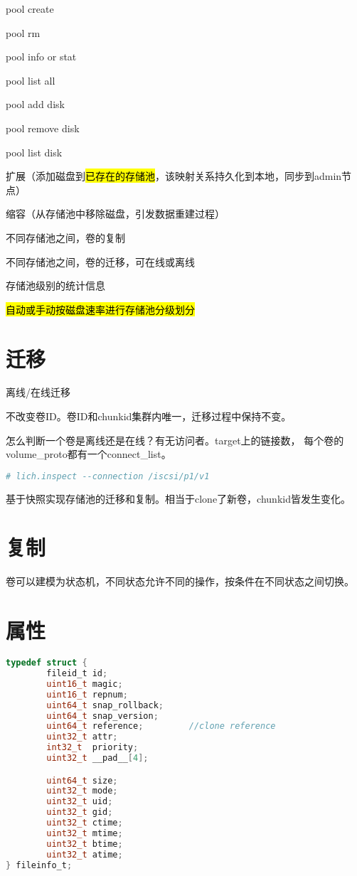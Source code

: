 \begin{enumbox}
\item pool create
\item pool rm
\item pool info or stat
\item pool list all
\item pool add disk
\item pool remove disk
\item pool list disk
\item 扩展（添加磁盘到\hl{已存在的存储池}，该映射关系持久化到本地，同步到admin节点）
\item 缩容（从存储池中移除磁盘，引发数据重建过程）
\item 不同存储池之间，卷的复制
\item 不同存储池之间，卷的迁移，可在线或离线
\item 存储池级别的统计信息
\item \hl{自动或手动按磁盘速率进行存储池分级划分}
\end{enumbox}

\section{迁移}

离线/在线迁移

不改变卷ID。卷ID和chunkid集群内唯一，迁移过程中保持不变。

怎么判断一个卷是离线还是在线？有无访问者。target上的链接数，
每个卷的volume\_proto都有一个connect\_list。

\begin{lstlisting}[language=bash,frame=single]
# lich.inspect --connection /iscsi/p1/v1
\end{lstlisting}

基于快照实现存储池的迁移和复制。相当于clone了新卷，chunkid皆发生变化。

\section{复制}

卷可以建模为状态机，不同状态允许不同的操作，按条件在不同状态之间切换。

\section{属性}

\begin{lstlisting}[language=c,frame=single]
typedef struct {
        fileid_t id;
        uint16_t magic;
        uint16_t repnum;
        uint64_t snap_rollback;
        uint64_t snap_version;
        uint64_t reference;         //clone reference
        uint32_t attr;
        int32_t  priority;
        uint32_t __pad__[4];

        uint64_t size;
        uint32_t mode;
        uint32_t uid;
        uint32_t gid;
        uint32_t ctime;
        uint32_t mtime;
        uint32_t btime;
        uint32_t atime;
} fileinfo_t;
\end{lstlisting}


